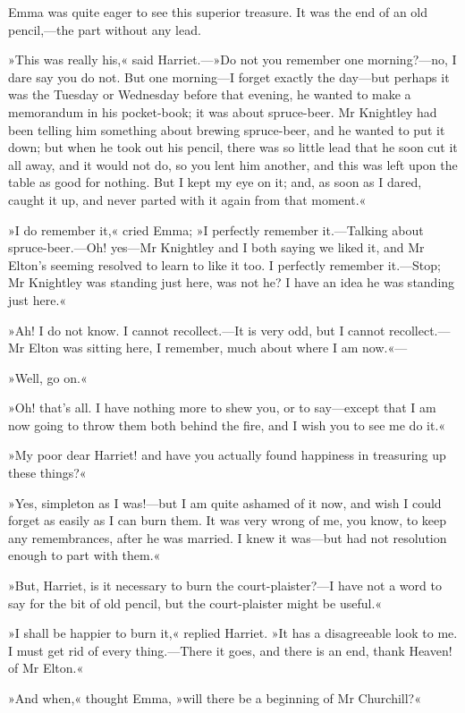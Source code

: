 Emma was quite eager to see this superior treasure. It was the end of an old pencil,—the part without any lead.

»This was really his,« said Harriet.—»Do not you remember one morning?—no, I dare say you do not. But one morning—I forget exactly the day—but perhaps it was the Tuesday or Wednesday before that evening, he wanted to make a memorandum in his pocket-book; it was about spruce-beer. Mr Knightley had been telling him something about brewing spruce-beer, and he wanted to put it down; but when he took out his pencil, there was so little lead that he soon cut it all away, and it would not do, so you lent him another, and this was left upon the table as good for nothing. But I kept my eye on it; and, as soon as I dared, caught it up, and never parted with it again from that moment.«

»I do remember it,« cried Emma; »I perfectly remember it.—Talking about spruce-beer.—Oh! yes—Mr Knightley and I both saying we liked it, and Mr Elton's seeming resolved to learn to like it too. I perfectly remember it.—Stop; Mr Knightley was standing just here, was not he? I have an idea he was standing just here.«

»Ah! I do not know. I cannot recollect.—It is very odd, but I cannot recollect.—Mr Elton was sitting here, I remember, much about where I am now.«—

»Well, go on.«

»Oh! that's all. I have nothing more to shew you, or to say—except that I am now going to throw them both behind the fire, and I wish you to see me do it.«

»My poor dear Harriet! and have you actually found happiness in treasuring up these things?«

»Yes, simpleton as I was!—but I am quite ashamed of it now, and wish I could forget as easily as I can burn them. It was very wrong of me, you know, to keep any remembrances, after he was married. I knew it was—but had not resolution enough to part with them.«

»But, Harriet, is it necessary to burn the court-plaister?—I have not a word to say for the bit of old pencil, but the court-plaister might be useful.«

»I shall be happier to burn it,« replied Harriet. »It has a disagreeable look to me. I must get rid of every thing.—There it goes, and there is an end, thank Heaven! of Mr Elton.«

»And when,« thought Emma, »will there be a beginning of Mr Churchill?«

